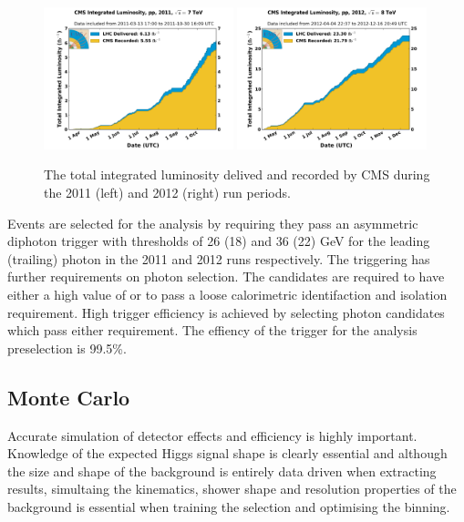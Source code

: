 \begin{figure}
  \includegraphics[width=0.49\textwidth]{ch3_comm_anal_comps/plots/int_lumi_2011.pdf}
  \includegraphics[width=0.49\textwidth]{ch3_comm_anal_comps/plots/int_lumi_2012.pdf}
  \caption{The total integrated luminosity delived and recorded by CMS during the 2011 (left) and 2012 (right) run periods.}
  \label{fig:intlumi}
\end{figure}

Events are selected for the analysis by requiring they pass an asymmetric diphoton trigger with \ET thresholds of 26 (18) and 36 (22) GeV for the leading (trailing) photon in the 2011 and 2012 runs respectively. The triggering has further requirements on photon selection. The candidates are required to have either a high value of \rnine or to pass a loose calorimetric identifaction and isolation requirement. High trigger efficiency is achieved by selecting photon candidates which pass either requirement. The effiency of the trigger for the analysis preselection is 99.5\%.

\subsection{Monte Carlo}

Accurate simulation of detector effects and efficiency is highly important. Knowledge of the expected Higgs signal shape is clearly essential and although the size and shape of the \mgg background is entirely data driven when extracting results, simultaing the kinematics, shower shape and resolution properties of the background is essential when training the selection and optimising the binning. 

